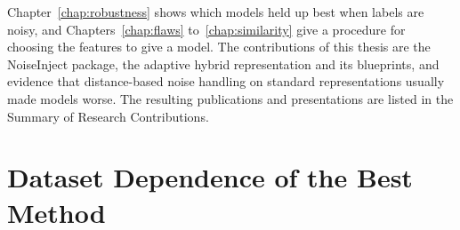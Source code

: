 
Chapter~\ref{chap:robustness} shows which models held up best when labels are noisy, and Chapters~\ref{chap:flaws} to~\ref{chap:similarity} give a procedure for choosing the features to give a model. The contributions of this thesis are the NoiseInject package, the adaptive hybrid representation and its blueprints, and evidence that distance-based noise handling on standard representations usually made models worse. The resulting publications and presentations are listed in the Summary of Research Contributions.



\section{Dataset Dependence of the Best Method}
